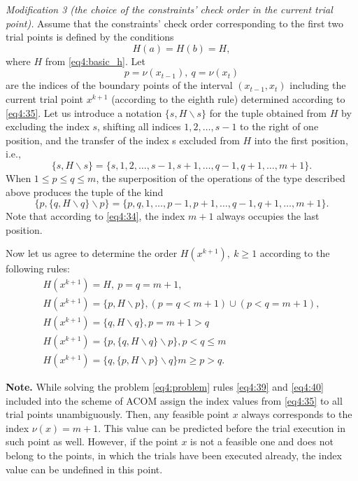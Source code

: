 \emph{Modification 3 (the choice of the constraints’ check order in the current trial point).} Assume that the constraints’ check order corresponding to the first two trial points is defined by
the conditions
\begin{equation}
  \label{eq4:39}
  H(a)=H(b)=H,
\end{equation}
where $H$ from \eqref{eq4:basic_h}. Let
\begin{displaymath}
  p=\nu(x_{t-1}),\: q=\nu(x_t)
\end{displaymath}
are the indices of the boundary points of the interval $(x_{t-1},x_t)$ including the current trial point $x^{k+1}$ (according to the eighth rule) determined according to \eqref{eq4:35}. Let us introduce a notation $\{s,H\backslash s\}$ for the tuple obtained from $H$ by excluding the index $s$, shifting all indices $1,2,\dots,s-1$ to the right of one position, and the transfer of the index s excluded from $H$ into the first position, i.e.,
\begin{displaymath}
  \{s,H\backslash s\}=\{s,1,2,\dots,s-1,s+1,\dots,q-1,q+1,\dots,m+1\}.
\end{displaymath}
When $1\le p\le q\le m$, the superposition of the operations of the type described above produces the tuple of the kind
\begin{displaymath}
  \{p,\{q,H\backslash q\}\backslash p\}=\{p,q,1,\dots,p-1,p+1,\dots,q-1,q+1,\dots,m+1\}.
\end{displaymath}
Note that according to \eqref{eq4:34}, the index $m+1$ always occupies the last position.

Now let us agree to determine the order $H(x^{k+1}),\: k\ge 1$ according to the following rules:
\begin{gather}
 H(x^{k+1})=H,\: p=q=m+1, \nonumber \\
 H(x^{k+1})=\{p,H\backslash p\}, (p=q<m+1)\cup(p<q=m+1), \nonumber \\
 \label{eq4:40}
 H(x^{k+1})=\{q,H\backslash q\}, p=m+1>q\\
 H(x^{k+1})=\{p, \{q,H\backslash q\}\backslash p\}, p<q\le m \nonumber \\
 H(x^{k+1})=\{q, \{p,H\backslash p\}\backslash q\} m\ge p>q. \nonumber
\end{gather}

\textbf{Note.} While solving the problem \eqref{eq4:problem} rules \eqref{eq4:39} and \eqref{eq4:40} included into the scheme of ACOM assign the index values from \eqref{eq4:35} to all trial points unambiguously. Then, any feasible point $x$ always corresponds to the index $\nu(x)=m+1$. This value can be predicted before the trial execution in such point as well. However, if the point $x$ is not a feasible one and does not belong to the points, in which the trials have been executed already, the index value can be undefined in this point.


